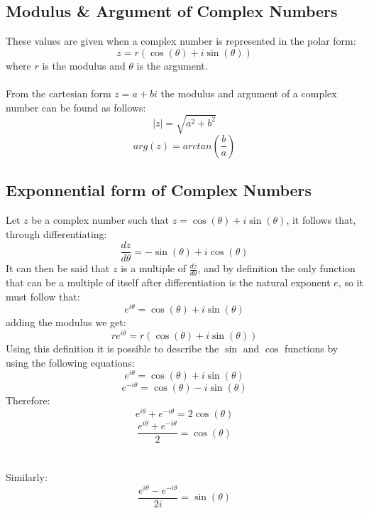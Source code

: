 \documentclass{article}
\begin{document}
\subsection{Modulus \& Argument of Complex Numbers}
These values are given when a complex number is represented in the polar form:
\[z=r\left(\cos\left(\theta\right) + i\sin\left(\theta\right)\right)\]
where \(r\) is the modulus and \(\theta\) is the argument. \\\\
From the cartesian form \(z=a+bi\) the modulus and argument of a complex number can be found as follows:
\[|z|=\sqrt{a^2 + b^2}\]
\[arg\left(z\right) = arctan\left(\frac{b}{a}\right)\]
\subsection{Exponnential form of Complex Numbers}
Let \(z\) be a complex number such that \(z=\cos\left(\theta\right) +i\sin\left(\theta\right)\), it follows that, through differentiating:
\[\frac{dz}{d\theta}=-\sin\left(\theta\right) +i\cos\left(\theta\right)\]
It can then be said that \(z\) is a multiple of \(\frac{dz}{d\theta}\), and by definition the only function that can be a multiple of itself after differentiation is the natural exponent \(e\), so it must follow that:
\[e^{i\theta}=\cos\left(\theta\right) +i\sin\left(\theta\right)\]
adding the modulus we get:
\[re^{i\theta} = r(\cos\left(\theta\right) +i\sin\left(\theta\right))\]
Using this definition it is possible to describe the \(\sin\) and \(\cos\) functions by using the following equations:
\[e^{i\theta}= \cos\left(\theta\right)+i\sin\left(\theta\right)\]
\[e^{-i\theta}=\cos\left(\theta\right)-i\sin\left(\theta\right)\]
Therefore:
\[e^{i\theta}+e^{-i\theta}=2\cos\left(\theta\right)\]
\[\frac{e^{i\theta}+e^{-i\theta}}{2}=\cos\left(\theta\right)\] \\\\
Similarly:
\[\frac{e^{i\theta}-e^{-i\theta}}{2i}=\sin\left(\theta\right)\]
\end{document}
